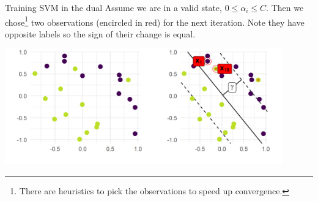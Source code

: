 \documentclass[11pt,compress,t,notes=noshow, xcolor=table]{beamer}
\begin{document}
\begin{vbframe}{Training SVM in the dual}
\framebreak
\normalsize
Assume we are in a valid state, $0 \leq \alpha_i \leq C$. Then we chose\footnote{There are heuristics to pick the observations to speed up convergence.} two observations (encircled in red) for the next iteration.
Note they have opposite labels so the sign of their change is equal.

\vspace{0.2cm}
\begin{center}
\includegraphics[width = 0.9\textwidth]{figure/svm_training_01.png} \\
\end{center}

   
\end{vbframe}
\end{document}
